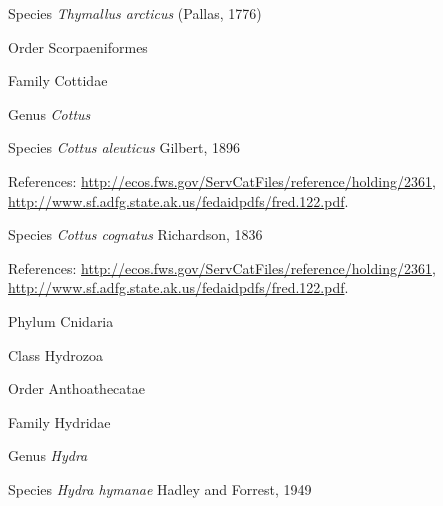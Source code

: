 \documentclass[9pt, article]{memoir}
\begin{document}
\begin{multicols}{2}
\vspace{6pt}\noindent\hspace{36pt}Species \textit{Thymallus arcticus} (Pallas, 1776)


\vspace{6pt}\noindent\hspace{18pt}Order Scorpaeniformes


\vspace{6pt}\noindent\hspace{24pt}Family Cottidae


\vspace{6pt}\noindent\hspace{30pt}Genus \textit{Cottus}


\vspace{6pt}\noindent\hspace{36pt}Species \textit{Cottus aleuticus} Gilbert, 1896


\vspace{6pt}References: 
\url{http://ecos.fws.gov/ServCatFiles/reference/holding/2361}, 
\url{http://www.sf.adfg.state.ak.us/fedaidpdfs/fred.122.pdf}.

\vspace{6pt}\noindent\hspace{36pt}Species \textit{Cottus cognatus} Richardson, 1836


\vspace{6pt}References: 
\url{http://ecos.fws.gov/ServCatFiles/reference/holding/2361}, 
\url{http://www.sf.adfg.state.ak.us/fedaidpdfs/fred.122.pdf}.

\vspace{6pt}\noindent\hspace{6pt}Phylum Cnidaria


\vspace{6pt}\noindent\hspace{12pt}Class Hydrozoa


\vspace{6pt}\noindent\hspace{18pt}Order Anthoathecatae


\vspace{6pt}\noindent\hspace{24pt}Family Hydridae


\vspace{6pt}\noindent\hspace{30pt}Genus \textit{Hydra}


\vspace{6pt}\noindent\hspace{36pt}Species \textit{Hydra hymanae} Hadley and Forrest, 1949



\end{multicols}
\end{document}
